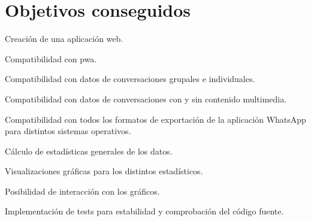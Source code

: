 \begin{comment}
The relevant idea behind the estimator developed in Section \ref{reamining_time_at_anytime} is that it can be understood as a system that corrects the estimations provided by another system. This could be an easy to implement solution for improving the accuracy of the estimations made by more complex systems just by setting it prior to them.

The main limitation for implementing the proposed online estimator is the bottleneck produced by the \acrshort{crtm} \acrshort{api} server, which would not be able to handle all the needed requests for sampling all the bus stops at the same time. Nevertheless, the computational cost of each of the used models was calculated in case that the processing capacity requirements were to be consider for a future implementation.

In general, the developed methods in this Project are built in a way that allows the usability for other similar use cases. The hyperparameters of the estimators are chosen based on the data and the available input features, so they can be easily adapted for different system behaviors.
\end{comment}

\section{Objetivos conseguidos}
\label{sec:achieved-goals}
\begin{description}
	
\item Creación de una aplicación web.
\item Compatibilidad con \acrfull{pwa}.
\item Compatibilidad con datos de conversaciones grupales e individuales.
\item Compatibilidad con datos de conversaciones con y sin contenido multimedia.
\item Compatibilidad con todos los formatos de exportación de la aplicación WhatsApp para distintos sistemas operativos.
\item Cálculo de estadísticas generales de los datos.
\item Visualizaciones gráficas para los distintos estadísticos.
\item Posibilidad de interacción con los gráficos.
\item Implementación de tests para estabilidad y comprobación del código fuente.

\end{description}

